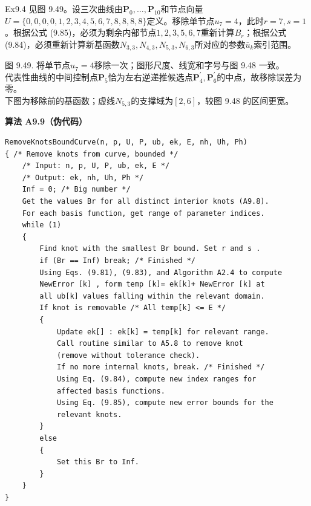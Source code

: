 \documentclass[../main.tex]{subfiles}
\begin{document}
Ex9.4 见图 9.49。设三次曲线由$\mathbf P_0,\ldots,\mathbf P_{10}$和节点向量$U=\{0,0,0,0,1,2,3,4,5,6,7,8,8,8,8\}$定义。移除单节点$u_7=4$，此时$r=7,s=1$。根据公式 (9.85)，必须为剩余内部节点$1,2,3,5,6,7$重新计算$B_r$；根据公式 (9.84)，必须重新计算新基函数$N_{3,3},N_{4,3},N_{5,3},N_{6,3}$所对应的参数$\bar u_k$索引范围。

\begin{center}
\begin{minipage}{23cm}
\vspace*{.6\baselineskip}
\centering
{}
\par\smallskip
图 9.49. 将单节点$u_7=4$移除一次；图形尺度、线宽和字号与图 9.48 一致。\\
代表性曲线的中间控制点$\mathbf P_5$恰为左右逆递推候选点$\mathbf P^{\prime}_4,\mathbf P^{\prime}_6$的中点，故移除误差为零。\\
下图为移除前的基函数；虚线$N_{5,3}$的支撑域为$[2,6]$，较图 9.48 的区间更宽。
\end{minipage}
\end{center}



\par\medskip\noindent\textbf{算法 A9.9（伪代码）}\par
\begin{verbatim}
RemoveKnotsBoundCurve(n, p, U, P, ub, ek, E, nh, Uh, Ph)
{ /* Remove knots from curve, bounded */
    /* Input: n, p, U, P, ub, ek, E */
    /* Output: ek, nh, Uh, Ph */
    Inf = 0; /* Big number */
    Get the values Br for all distinct interior knots (A9.8).
    For each basis function, get range of parameter indices.
    while (1)
    {
        Find knot with the smallest Br bound. Set r and s .
        if (Br == Inf) break; /* Finished */
        Using Eqs. (9.81), (9.83), and Algorithm A2.4 to compute
        NewError [k] , form temp [k]= ek[k]+ NewError [k] at
        all ub[k] values falling within the relevant domain.
        If knot is removable /* All temp[k] <= E */
        {
            Update ek[] : ek[k] = temp[k] for relevant range.
            Call routine similar to A5.8 to remove knot
            (remove without tolerance check).
            If no more internal knots, break. /* Finished */
            Using Eq. (9.84), compute new index ranges for
            affected basis functions.
            Using Eq. (9.85), compute new error bounds for the
            relevant knots.
        }
        else
        {
            Set this Br to Inf.
        }
    }
}
\end{verbatim}
\end{document}
